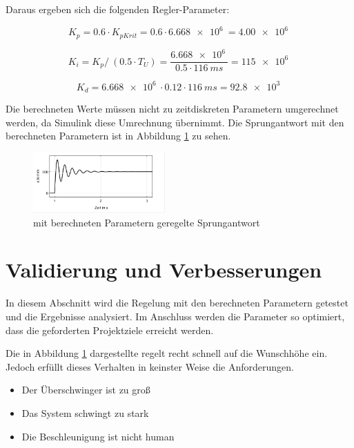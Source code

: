 Daraus ergeben sich die folgenden Regler-Parameter:

\begin{equation}
	K_{p} = 0.6 \cdot K_{pKrit} = 0.6 \cdot \SI{6,668e6}{} = \SI{4,00e6}{}
\end{equation}

\begin{equation}
	K_{i} = K_p/~(0.5 \cdot T_U) =   \frac{\SI{6,668e6}{} } {0.5 \cdot \SI{116}{ms}} = \SI{115e6}{}
\end{equation}

\begin{equation}
	K_{d} = \SI{6,668e6}{} \cdot 0.12 \cdot \SI{116}{ms} =\SI{92,8e3}{}
\end{equation}

Die berechneten Werte müssen nicht zu zeitdiskreten Parametern umgerechnet werden, da Simulink diese Umrechnung übernimmt.
Die Sprungantwort mit den berechneten Parametern ist in Abbildung \ref{geregelteSprungantwortSchwingend} zu sehen.



\begin{figure}[h] 
	\centering
		\includegraphics[width=0.45\textwidth]{Bilder/geregelteStepresponseSchwingend.png}
	\caption{mit berechneten Parametern geregelte Sprungantwort}
	\label{geregelteSprungantwortSchwingend}
\end{figure}



\section{Validierung und Verbesserungen}
In diesem Abschnitt wird die Regelung mit den berechneten
Parametern getestet und die Ergebnisse analysiert. Im
Anschluss werden die Parameter so optimiert, dass die
geforderten Projektziele erreicht werden.

Die in Abbildung \ref{geregelteSprungantwortSchwingend} dargestellte regelt recht schnell auf die Wunschhöhe ein.
Jedoch erfüllt dieses Verhalten in keinster Weise die Anforderungen.

\begin{itemize}
	\item Der Überschwinger ist zu groß
	\item Das System schwingt zu stark
	\item Die Beschleunigung ist nicht human
\end{itemize}

